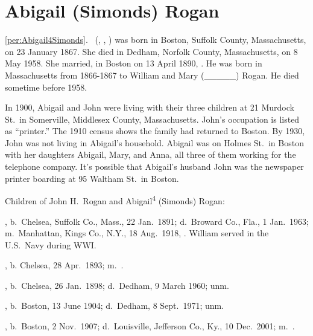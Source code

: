 \section{Abigail (Simonds) Rogan}

\ref{per:Abigail4Simonds}.\  (, , ) was born in Boston, Suffolk County, Massachusetts, on 23 January 1867.\cite{Abigail4SimondsBirth} She died in Dedham, Norfolk County, Massachusetts, on 8 May 1958.\cite{Abigail4SimondsDeath} She married, in Boston on 13 April 1890, . He was born in Massachusetts from 1866-1867 to William and Mary (\_\_\_\_\_) Rogan.\cite{Census1880JohnRogan} He died sometime before 1958.\cite{Abigail4SimondsDeath}

In 1900, Abigail and John were living with their three children at 21 Murdock St.\ in Somerville, Middlesex County, Massachusetts. John's occupation is listed as ``printer.''\cite{Census1900AbigailSimonds} The 1910 census shows the family had returned to Boston.\cite{Census1910AbigailSimonds} By 1930, John was not living in Abigail's household. Abigail was on Holmes St.\ in Boston with her daughters Abigail, Mary, and Anna, all three of them working for the telephone company.\cite{Census1930AbigailSimonds} It's possible that Abigail's husband John was the newspaper printer boarding at 95 Waltham St.\ in Boston.\cite{Census1930JohnRogan}

\begin{KidsIntro}
	Children of John H.\ Rogan and Abigail\textsuperscript{4} (Simonds) Rogan:
\end{KidsIntro}

\begin{Kids}
	, b.\ Chelsea, Suffolk Co., Mass., 22 Jan.\ 1891;\cite{William5RoganBirth} d.\ Broward Co., Fla., 1 Jan.\ 1963;\cite{William5RoganDeath,William5RoganHeadstone} m.\ Manhattan, Kings Co., N.Y., 18 Aug.\ 1918, .\cite{William5RoganMarriage} William served in the U.S.\ Navy during WWI.\cite{William5RoganHeadstone}
	
	, b. Chelsea, 28 Apr.\ 1893;\cite{Marguerite5RoganBirth} m.\ .\cite{Census1940Marguerite5Rogan}
	
	, b.\ Chelsea, 26 Jan.\ 1898;\cite{Abigail5RoganBirth} d.\ Dedham, 9 March 1960; unm.\cite{Abigail5RoganDeath}
	
	, b.\ Boston, 13 June 1904;\cite{Mary5RoganBirth} d.\ Dedham, 8 Sept.\ 1971; unm.\cite{Mary5RoganDeath}
	
	, b.\ Boston, 2 Nov.\ 1907;\cite{Anne5RoganBirth} d.\ Louisville, Jefferson Co., Ky., 10 Dec.\ 2001;\cite{Anne5RoganDeath} m.\ .\cite{Census1940Anne5Rogan}
\end{Kids}